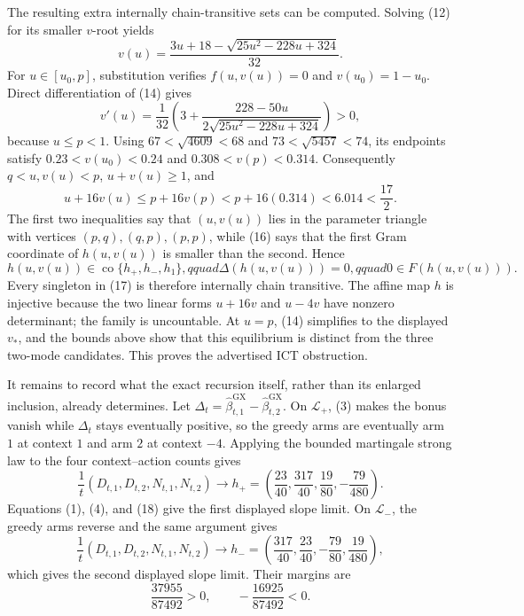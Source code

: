 The resulting extra internally chain-transitive sets can be computed. Solving (12) for its smaller \(v\)-root yields
\[
 v(u)=\frac{3u+18-\sqrt{25u^2-228u+324}}{32}. \tag{14}
\]
For \(u\in[u_0,p]\), substitution verifies \(f(u,v(u))=0\) and \(v(u_0)=1-u_0\). Direct differentiation of (14) gives
\[
 v'(u)=\frac1{32}\left(3+\frac{228-50u}{2\sqrt{25u^2-228u+324}}\right)>0, \tag{15}
\]
because \(u\le p<1\). Using \(67<\sqrt{4609}<68\) and \(73<\sqrt{5457}<74\), its endpoints satisfy \(0.23<v(u_0)<0.24\) and \(0.308<v(p)<0.314\). Consequently \(q<u,v(u)<p\), \(u+v(u)\ge1\), and
\[
 u+16v(u)\le p+16v(p)<p+16(0.314)<6.014<\frac{17}{2}. \tag{16}
\]
The first two inequalities say that \((u,v(u))\) lies in the parameter triangle with vertices \((p,q),(q,p),(p,p)\), while (16) says that the first Gram coordinate of \(h(u,v(u))\) is smaller than the second. Hence
\[
 h(u,v(u))\in\operatorname{co}\{h_+,h_-,h_1\},qquad
 \Delta(h(u,v(u)))=0,qquad 0\in F(h(u,v(u))). \tag{17}
\]
Every singleton in (17) is therefore internally chain transitive. The affine map \(h\) is injective because the two linear forms \(u+16v\) and \(u-4v\) have nonzero determinant; the family is uncountable. At \(u=p\), (14) simplifies to the displayed \(v_*\), and the bounds above show that this equilibrium is distinct from the three two-mode candidates. This proves the advertised ICT obstruction.

It remains to record what the exact recursion itself, rather than its enlarged inclusion, already determines. Let \(\Delta_t=\widehat\beta^{\mathrm{GX}}_{t,1}-\widehat\beta^{\mathrm{GX}}_{t,2}\). On \(\mathcal L_+\), (3) makes the bonus vanish while \(\Delta_t\) stays eventually positive, so the greedy arms are eventually arm \(1\) at context \(1\) and arm \(2\) at context \(-4\). Applying the bounded martingale strong law to the four context--action counts gives
\[
 \frac1t(D_{t,1},D_{t,2},N_{t,1},N_{t,2})
 \longrightarrow h_+=\left(\frac{23}{40},\frac{317}{40},\frac{19}{80},-\frac{79}{480}\right). \tag{18}
\]
Equations (1), (4), and (18) give the first displayed slope limit. On \(\mathcal L_-\), the greedy arms reverse and the same argument gives
\[
 \frac1t(D_{t,1},D_{t,2},N_{t,1},N_{t,2})
 \longrightarrow h_-=\left(\frac{317}{40},\frac{23}{40},-\frac{79}{80},\frac{19}{480}\right), \tag{19}
\]
which gives the second displayed slope limit. Their margins are
\[
 \frac{37955}{87492}>0,\qquad -\frac{16925}{87492}<0. \tag{20}
\]

